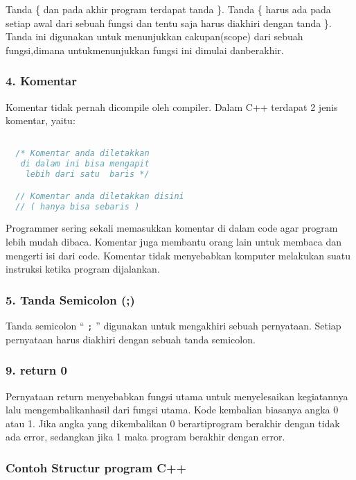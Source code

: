 Tanda \{ dan pada akhir program terdapat tanda \}. Tanda \{ harus ada
pada setiap awal dari sebuah fungsi dan tentu saja harus diakhiri dengan
tanda \}. Tanda ini digunakan untuk menunjukkan cakupan(scope) dari
sebuah fungsi,dimana untukmenunjukkan fungsi ini dimulai danberakhir.

\subsubsection*{4. Komentar}\label{komentar}

Komentar tidak pernah dicompile oleh compiler. Dalam C++ terdapat 2
jenis komentar, yaitu:

\begin{lstlisting}[language=c++, numbers=none]

  /* Komentar anda diletakkan
   di dalam ini bisa mengapit
    lebih dari satu  baris */

  // Komentar anda diletakkan disini
  // ( hanya bisa sebaris )
\end{lstlisting}

Programmer sering sekali memasukkan komentar di dalam code agar program
lebih mudah dibaca. Komentar juga membantu orang lain untuk membaca dan
mengerti isi dari code. Komentar tidak menyebabkan komputer melakukan
suatu instruksi ketika program dijalankan.

\subsubsection*{5. Tanda Semicolon (;)}\label{tanda-semicolon}

Tanda semicolon `` \texttt{;} '' digunakan untuk mengakhiri sebuah
pernyataan. Setiap pernyataan harus diakhiri dengan sebuah tanda
semicolon.

\subsubsection*{9. return 0}\label{return-0}

Pernyataan return menyebabkan fungsi utama untuk menyelesaikan
kegiatannya lalu mengembalikanhasil dari fungsi utama. Kode kembalian
biasanya angka 0 atau 1. Jika angka yang dikembalikan 0 berartiprogram
berakhir dengan tidak ada error, sedangkan jika 1 maka program berakhir
dengan error.

\subsubsection{Contoh Structur program C++}

